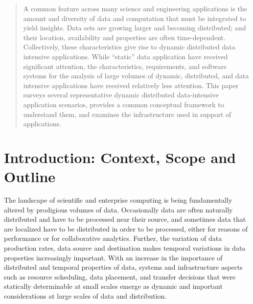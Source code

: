 
\begin{abstract}
  A common feature across many science and engineering applications is the
  amount and diversity of data and computation that must be integrated to yield
  insights. Data sets are growing larger and becoming distributed; and their
  location, availability and properties are often time-dependent. Collectively, these
  characteristics give rise to dynamic distributed data intensive
  applications. While ``static'' data application have received significant
  attention, the characteristics, requirements, and software systems for the
  analysis of large volumes of dynamic, distributed, and data intensive applications have
  received relatively less attention. This paper surveys several representative dynamic
  distributed data-intensive application scenarios, provides a common conceptual
  framework to understand them, and examines the infrastructure used in support
  of applications.

\end{abstract}
\maketitle



%

\section{Introduction: Context, Scope and Outline}



The landscape of scientific and enterprise computing is being fundamentally
altered by prodigious volumes of data.  Occasionally data are often naturally
distributed and have to be processed near their source, and sometimes data that
are localized have to be distributed in order to be processed, either for
reasons of performance or for collaborative analytics.  Further, the variation
of data production rates, data source and destination makes temporal variations
in data properties increasingly important.  With an increase in the importance
of distributed and temporal properties of data, systems and infrastructure
aspects such as resource scheduling, data placement, and transfer decisions that
were statically determinable at small scales emerge as dynamic and important
considerations at large scales of data and distribution.

